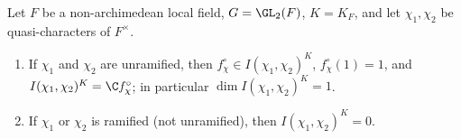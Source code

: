 Let $F$ be a non-archimedean local field, $G=\GL_2(F)$, $K=K_F$, and let $\chi_1,\chi_2$ be quasi-characters of
$F^\times$.
\begin{enumerate}[label=(\alph*)]
\item If $\chi_1$ and $\chi_2$ are unramified, then $f^\circ_\chi\in I(\chi_1,\chi_2)^K$, $f^\circ_\chi(1)=1$, and
  $I(\chi_1,\chi_2)^K=\C f^\circ_\chi$; in particular $\dim I(\chi_1,\chi_2)^K=1$.
\item If $\chi_1$ or $\chi_2$ is ramified (not unramified), then $I(\chi_1,\chi_2)^K=0$.
\end{enumerate}
